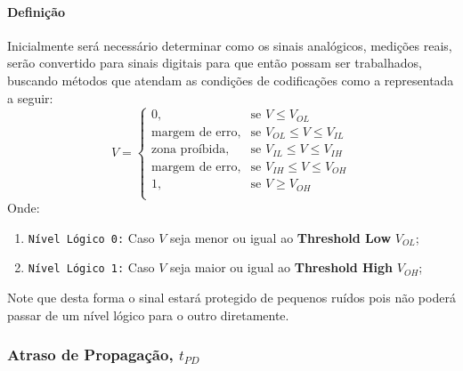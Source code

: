 \documentclass{article}
\begin{document}
                \paragraph{Definição}Inicialmente será necessário determinar como os sinais analógicos, medições reais, serão convertido para sinais digitais para que então possam ser trabalhados, buscando métodos que atendam as condições de codificações como a representada a seguir:
                    \begin{equation}
                        \boxed{
                            V = 
                            \begin{cases}
                                0,                      & \text{se } V \leq V_{OL}\\
                                \text{margem de erro},  & \text{se } V_{OL} \leq V \leq V_{IL}\\
                                \text{zona proíbida},   & \text{se } V_{IL} \leq V \leq V_{IH}\\
                                \text{margem de erro},  & \text{se } V_{IH} \leq V \leq V_{OH}\\
                                1,                      & \text{se } V \geq V_{OH}\\
                            \end{cases}
                        }
                    \end{equation}
                Onde:
                    \begin{enumerate}[noitemsep]
                        \item \texttt{Nível Lógico 0:} Caso $V$ seja menor ou igual ao \textbf{Threshold Low} $V_{OL}$;

                        \item \texttt{Nível Lógico 1:} Caso $V$ seja maior ou igual ao \textbf{Threshold High} $V_{OH}$;
                    \end{enumerate}
                Note que desta forma o sinal estará protegido de pequenos ruídos pois não poderá passar de um nível lógico para o outro diretamente.

\newpage
        \subsubsection{Atraso de Propagação, $t_{PD}$}
\end{document}
